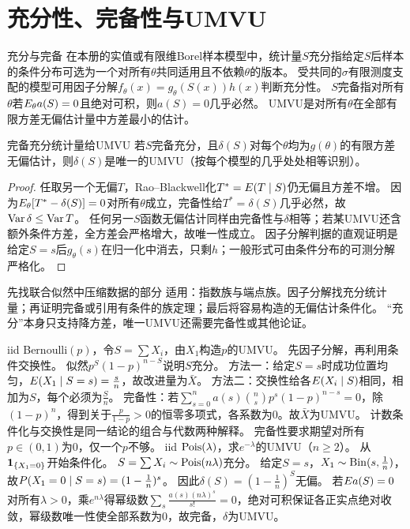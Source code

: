 \section{充分性、完备性与UMVU}\label{sec:73}
\begin{definition}{充分与完备}
在本册的实值或有限维Borel样本模型中，统计量$S$充分指给定$S$后样本的条件分布可选为一个对所有$\theta$共同适用且不依赖$\theta$的版本。
受共同的$\sigma$有限测度支配的模型可用因子分解$f_\theta(x)=g_\theta(S(x))h(x)$判断充分性。
$S$完备指对所有$\theta$若$E_\theta a(S)=0$且绝对可积，则$a(S)=0$几乎必然。
UMVU是对所有$\theta$在全部有限方差无偏估计量中方差最小的估计。
\end{definition}
\begin{theorem}{完备充分统计量给UMVU}
若$S$完备充分，且$\delta(S)$对每个$\theta$均为$g(\theta)$的有限方差无偏估计，则$\delta(S)$是唯一的UMVU（按每个模型的几乎处处相等识别）。
\end{theorem}
\begin{proof}
任取另一个无偏$T$，Rao--Blackwell化$T^*=E(T\mid S)$仍无偏且方差不增。
因为$E_\theta[T^*-\delta(S)]=0$对所有$\theta$成立，完备性给$T^*=\delta(S)$几乎必然，故$\operatorname{Var}\delta\le\operatorname{Var} T$。
任何另一$S$函数无偏估计同样由完备性与$\delta$相等；若某UMVU还含额外条件方差，全方差会严格增大，故唯一性成立。
因子分解判据的直观证明是给定$S=s$后$g_\theta(s)$在归一化中消去，只剩$h$；一般形式可由条件分布的可测分解严格化。
\end{proof}
\begin{method}{先找联合似然中压缩数据的部分}
适用：指数族与端点族。因子分解找充分统计量；再证明完备或引用有条件的族定理；最后将容易构造的无偏估计条件化。
“充分”本身只支持降方差，唯一UMVU还需要完备性或其他论证。
\end{method}
{iid Bernoulli$(p)$，令$S=\sum X_i$，由$X_1$构造$p$的UMVU。}
{先因子分解，再利用条件交换性。}
{似然$p^S(1-p)^{n-S}$说明$S$充分。
方法一：给定$S=s$时成功位置均匀，$E(X_1\mid S=s)=\frac{s}{n}$，故改进量为$\bar X$。
方法二：交换性给各$E(X_i\mid S)$相同，相加为$S$，每个必须为$\frac{S}{n}$。
完备性：若$\sum_{s=0}^na(s)\binom ns p^s(1-p)^{n-s}=0$，除$(1-p)^n$，得到关于$\frac{p}{1-p}>0$的恒零多项式，各系数为0。故$\bar X$为UMVU。}
{计数条件化与交换性是同一结论的组合与代数两种解释。}
{完备性要求期望对所有$p\in(0,1)$为0，仅一个$p$不够。}
{iid $\operatorname{Pois}(\lambda)$，求$e^{-\lambda}$的UMVU（$n\ge2$）。}
{从$\mathbf1_{\{X_1=0\}}$开始条件化。}
{$S=\sum X_i\sim\operatorname{Pois}(n\lambda)$充分。
给定$S=s$，$X_1\sim\operatorname{Bin}(s,\frac{1}{n})$，故$P(X_1=0\mid S=s)=(1-\frac{1}{n})^s$。
因此$\delta(S)=(1-\frac{1}{n})^S$无偏。
若$E a(S)=0$对所有$\lambda>0$，乘$e^{n\lambda}$得幂级数$\sum_s \frac{a(s)(n\lambda)^s}{s!}=0$，绝对可积保证各正实点绝对收敛，幂级数唯一性使全部系数为0，故完备，$\delta$为UMVU。}
